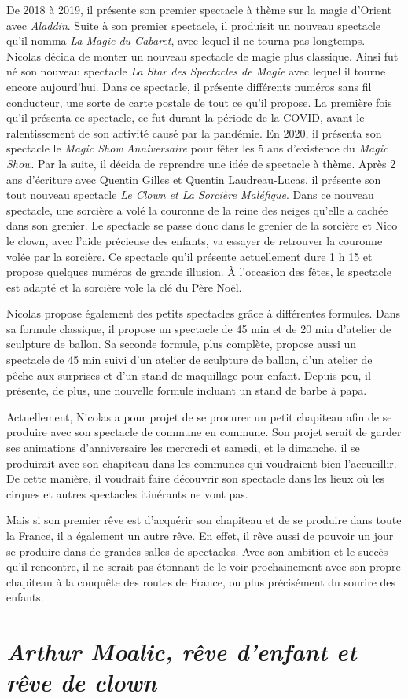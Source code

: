 De 2018 à 2019, il présente son premier spectacle à thème sur la magie d’Orient avec \textit{Aladdin}. Suite à son premier spectacle, il produisit un nouveau spectacle qu’il nomma \textit{La Magie du Cabaret}, avec lequel il ne tourna pas longtemps. Nicolas décida de monter un nouveau spectacle de magie plus classique. Ainsi fut né son nouveau spectacle \textit{La Star des Spectacles de Magie} avec lequel il tourne encore aujourd’hui. Dans ce spectacle, il présente différents numéros sans fil conducteur, une sorte de carte postale de tout ce qu’il propose. La première fois qu’il présenta ce spectacle, ce fut durant la période de la COVID, avant le ralentissement de son activité causé par la pandémie. En 2020, il présenta son spectacle le \textit{Magic Show Anniversaire} pour fêter les 5 ans d'existence du \textit{Magic Show}. Par la suite, il décida de reprendre une idée de spectacle à thème. Après 2 ans d’écriture avec Quentin Gilles et Quentin Laudreau-Lucas, il présente son tout nouveau spectacle \textit{Le Clown et La Sorcière Maléfique}. Dans ce nouveau spectacle, une sorcière a volé la couronne de la reine des neiges qu’elle a cachée dans son grenier. Le spectacle se passe donc dans le grenier de la sorcière et Nico le clown, avec l’aide précieuse des enfants, va essayer de retrouver la couronne volée par la sorcière. Ce spectacle qu’il présente actuellement dure 1 h 15 et propose quelques numéros de grande illusion. À l’occasion des fêtes, le spectacle est adapté et la sorcière vole la clé du Père Noël.  

Nicolas propose également des petits spectacles grâce à différentes formules. Dans sa formule classique, il propose un spectacle de 45 min et de 20 min d’atelier de sculpture de ballon. Sa seconde formule, plus complète, propose aussi un spectacle de 45 min suivi d’un atelier de sculpture de ballon, d’un atelier de pêche aux surprises et d’un stand de maquillage pour enfant. Depuis peu, il présente, de plus, une nouvelle formule incluant un stand de barbe à papa.  

Actuellement, Nicolas a pour projet de se procurer un petit chapiteau afin de se produire avec son spectacle de commune en commune. Son projet serait de garder ses animations d’anniversaire les mercredi et samedi, et le dimanche, il se produirait avec son chapiteau dans les communes qui voudraient bien l’accueillir. De cette manière, il voudrait faire découvrir son spectacle dans les lieux où les cirques et autres spectacles itinérants ne vont pas. 

Mais si son premier rêve est d’acquérir son chapiteau et de se produire dans toute la France, il a également un autre rêve. En effet, il rêve aussi de pouvoir un jour se produire dans de grandes salles de spectacles. Avec son ambition et le succès qu’il rencontre, il ne serait pas étonnant de le voir prochainement avec son propre chapiteau à la conquête des routes de France, ou plus précisément du sourire des enfants. 

\section*{\textit{Arthur Moalic, rêve d’enfant et rêve de clown}}
{}










\thispagestyle{empty} %
